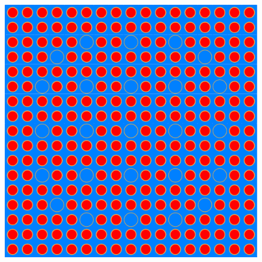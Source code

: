 \begin{figure}
    \centering
    \begin{minipage}{.4\textwidth}
      \centering
      \includegraphics[width=\textwidth]{figs/radial.pdf}
    \end{minipage}%
    \hspace{10em}
    \begin{minipage}{.15\textwidth}
      \centering

\end{minipage}
\end{figure}

